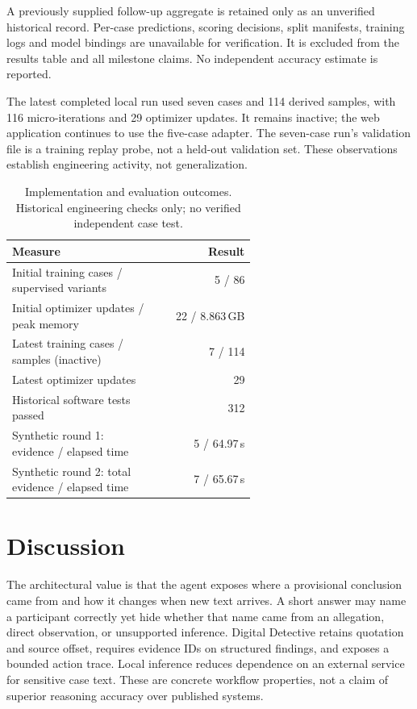 \documentclass[10pt,a4paper]{article}
\begin{document}
A previously supplied follow-up aggregate is retained only as an unverified historical record. Per-case predictions, scoring decisions, split manifests, training logs and model bindings are unavailable for verification. It is excluded from the results table and all milestone claims. No independent accuracy estimate is reported.

The latest completed local run used seven cases and 114 derived samples, with 116 micro-iterations and 29 optimizer updates. It remains inactive; the web application continues to use the five-case adapter. The seven-case run's validation file is a training replay probe, not a held-out validation set. These observations establish engineering activity, not generalization.

\begin{table}[t]
\centering\small
\caption{Implementation and evaluation outcomes. Historical engineering checks only; no verified independent case test.}
\label{tab:results}
\begin{tabular}{p{0.60\linewidth}r}
\toprule
Measure & Result\\
\midrule
Initial training cases / supervised variants & 5 / 86\\
Initial optimizer updates / peak memory & 22 / 8.863\,GB\\
Latest training cases / samples (inactive) & 7 / 114\\
Latest optimizer updates & 29\\
Historical software tests passed & 312\\
Synthetic round 1: evidence / elapsed time & 5 / 64.97\,s\\
Synthetic round 2: total evidence / elapsed time & 7 / 65.67\,s\\
\bottomrule
\end{tabular}
\end{table}

\section{Discussion}
The architectural value is that the agent exposes where a provisional conclusion came from and how it changes when new text arrives. A short answer may name a participant correctly yet hide whether that name came from an allegation, direct observation, or unsupported inference. Digital Detective retains quotation and source offset, requires evidence IDs on structured findings, and exposes a bounded action trace. Local inference reduces dependence on an external service for sensitive case text. These are concrete workflow properties, not a claim of superior reasoning accuracy over published systems.
\end{document}

